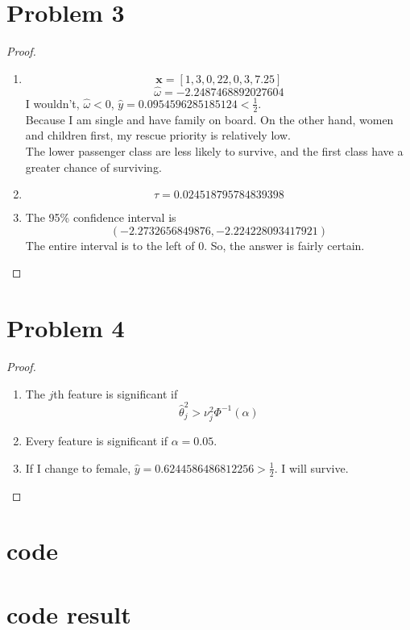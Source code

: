 \documentclass{article}
\begin{document}
\section*{Problem 3}
\begin{proof}
    \indent
    \begin{enumerate}[label=(\alph*)]
        \item $$\mathbf{x}=[1,
                            3,
                            0,
                            22,
                            0,
                            3,
                            7.25]$$
            $$\hat{\omega} = -2.2487468892027604$$
        I wouldn't, $\hat{\omega} < 0$, $\hat{y} = 0.0954596285185124 < \frac{1}{2}$.\\
        Because I am single and have family on board.
        On the other hand, women and children first, my rescue priority is relatively low.\\
        The lower passenger class are less likely to survive, and the first class have a greater chance of surviving.
        \item $$\tau = 0.024518795784839398$$
        \item The 95\% confidence interval is 
            $$(-2.2732656849876, -2.224228093417921)$$
            The entire interval is to the left of 0. So, the answer is fairly certain.
    \end{enumerate}
    \end{proof}

\section*{Problem 4}
    \begin{proof}
    \indent
    \begin{enumerate}[label=(\alph*)]
        \item  The $j$th feature is significant if
                $$\hat{\theta}_j^2 > \nu_j^2 \Phi^{-1}(\alpha)$$
        \item Every feature is significant if $\alpha = 0.05$.
        \item If I change to female, $\hat{y} = 0.6244586486812256 > \frac{1}{2}$. I will survive.
    \end{enumerate}
    \end{proof}
\pagebreak
\appendix
\section*{code}

\pagebreak
\section*{code result}

\end{document}

